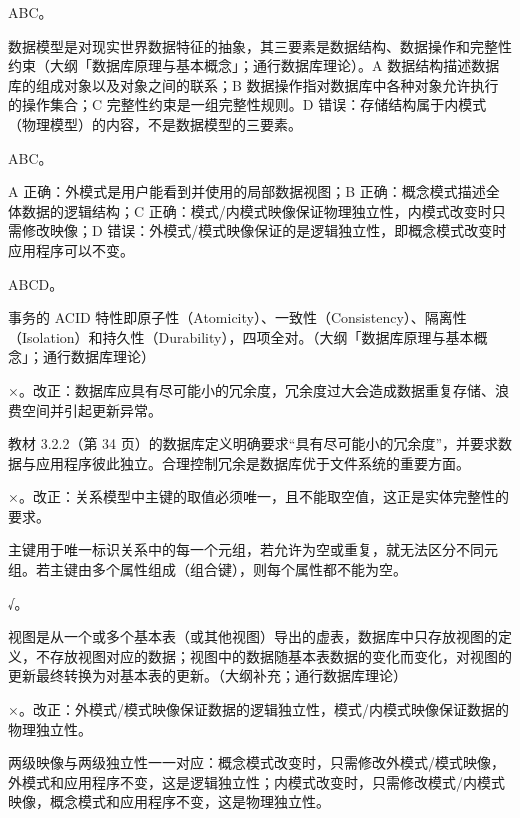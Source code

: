 \documentclass[a4paper,11pt]{article}
\begin{document}
\q ABC。\begin{analysis}数据模型是对现实世界数据特征的抽象，其三要素是数据结构、数据操作和完整性约束（大纲「数据库原理与基本概念」；通行数据库理论）。A 数据结构描述数据库的组成对象以及对象之间的联系；B 数据操作指对数据库中各种对象允许执行的操作集合；C 完整性约束是一组完整性规则。D 错误：存储结构属于内模式（物理模型）的内容，不是数据模型的三要素。\end{analysis}

\q ABC。\begin{analysis}A 正确：外模式是用户能看到并使用的局部数据视图；B 正确：概念模式描述全体数据的逻辑结构；C 正确：模式/内模式映像保证物理独立性，内模式改变时只需修改映像；D 错误：外模式/模式映像保证的是逻辑独立性，即概念模式改变时应用程序可以不变。\end{analysis}

\q ABCD。\begin{analysis}事务的 ACID 特性即原子性（Atomicity）、一致性（Consistency）、隔离性（Isolation）和持久性（Durability），四项全对。（大纲「数据库原理与基本概念」；通行数据库理论）\end{analysis}


\q ×。改正：数据库应具有尽可能小的冗余度，冗余度过大会造成数据重复存储、浪费空间并引起更新异常。\begin{analysis}教材 3.2.2（第 34 页）的数据库定义明确要求“具有尽可能小的冗余度”，并要求数据与应用程序彼此独立。合理控制冗余是数据库优于文件系统的重要方面。\end{analysis}

\q ×。改正：关系模型中主键的取值必须唯一，且不能取空值，这正是实体完整性的要求。\begin{analysis}主键用于唯一标识关系中的每一个元组，若允许为空或重复，就无法区分不同元组。若主键由多个属性组成（组合键），则每个属性都不能为空。\end{analysis}

\q √。\begin{analysis}视图是从一个或多个基本表（或其他视图）导出的虚表，数据库中只存放视图的定义，不存放视图对应的数据；视图中的数据随基本表数据的变化而变化，对视图的更新最终转换为对基本表的更新。（大纲补充；通行数据库理论）\end{analysis}

\q ×。改正：外模式/模式映像保证数据的逻辑独立性，模式/内模式映像保证数据的物理独立性。\begin{analysis}两级映像与两级独立性一一对应：概念模式改变时，只需修改外模式/模式映像，外模式和应用程序不变，这是逻辑独立性；内模式改变时，只需修改模式/内模式映像，概念模式和应用程序不变，这是物理独立性。\end{analysis}
\end{document}
